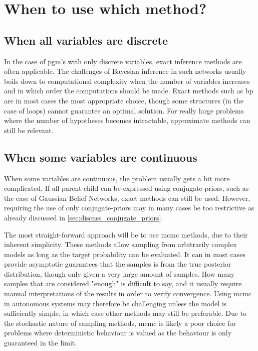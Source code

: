 \section{When to use which method?}

\subsection{When all variables are discrete}
In the case of \acrshort{pgm}'s with only discrete variables, exact inference methods are often applicable. The challenges of Bayesian inference in such networks usually boils down to computational complexity when the number of variables increases and in which order the computations should be made. Exact methods such as \acrshort{bp} are in most cases the most appropriate choice, though some structures (in the case of loops) cannot guarantee an optimal solution. For really large problems where the number of hypotheses becomes intractable, approximate methods can still be relevant. 

\subsection{When some variables are continuous}
When some variables are continuous, the problem usually gets a bit more complicated. If all parent-child can be expressed using conjugate-priors, such as the case of Gaussian Belief Networks, exact methods can still be used. However, requiring the use of only conjugate-priors may in many cases be too restrictive as already discussed in \cref{sec:discuss_conjugate_priors}.

The most straight-forward approach will be to use \acrshort{mcmc} methods, due to their inherent simplicity. These methods allow sampling from arbitrarily complex models as long as the target probability can be evaluated. It can in most cases provide asymptotic guarantees that the samples is from the true posterior distribution, though only given a very large amount of samples. How many samples that are considered "enough" is difficult to say, and it usually require manual interpretations of the results in order to verify convergence. Using \acrshort{mcmc} in autonomous systems may therefore be challenging unless the model is sufficiently simple, in which case other methods may still be preferable. Due to the stochastic nature of sampling methods, \acrshort{mcmc} is likely a poor choice for problems where deterministic behaviour is valued as the behaviour is only guaranteed in the limit.  

